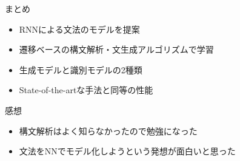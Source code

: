 \documentclass[aspectratio=43,unicode,10pt]{beamer}
\begin{document}
\begin{frame}{まとめ}
  \begin{itemize}
    \item RNNによる文法のモデルを提案
    \item 遷移ベースの構文解析・文生成アルゴリズムで学習
    \item 生成モデルと識別モデルの2種類
    \item State-of-the-artな手法と同等の性能
  \end{itemize}
\end{frame}

\begin{frame}{感想}
  \begin{itemize}
    \item 構文解析はよく知らなかったので勉強になった
    \item 文法をNNでモデル化しようという発想が面白いと思った
  \end{itemize}
\end{frame}
\end{document}
